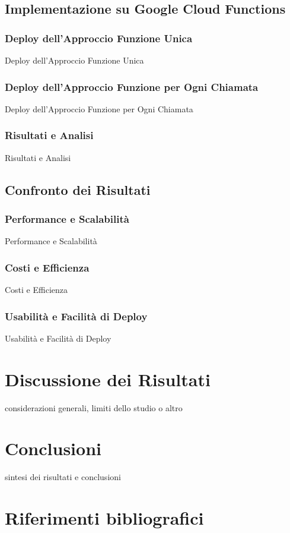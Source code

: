 \documentclass[12pt,a4paper,twoside]{book}
\begin{document}
\section{Implementazione su Google Cloud Functions}
\subsection{Deploy dell’Approccio Funzione Unica}
Deploy dell’Approccio Funzione Unica

\subsection{Deploy dell’Approccio Funzione per Ogni Chiamata}
Deploy dell’Approccio Funzione per Ogni Chiamata

\subsection{Risultati e Analisi}
Risultati e Analisi

\section{Confronto dei Risultati}
\subsection{Performance e Scalabilità}
Performance e Scalabilità

\subsection{Costi e Efficienza}
Costi e Efficienza

\subsection{Usabilità e Facilità di Deploy}
Usabilità e Facilità di Deploy

\chapter{Discussione dei Risultati}
considerazioni generali, limiti dello studio o altro

\chapter{Conclusioni}
sintesi dei risultati e conclusioni

\renewcommand{\bibsection}{}
\chapter*{Riferimenti bibliografici}

\end{document}
